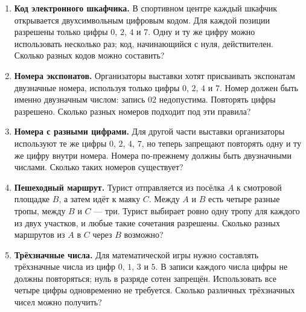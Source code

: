 \documentclass[a4paper,12pt]{article}
\newcommand{\mysub}[1]{\vspace{8pt}{\large\bfseries\color{darkaccent}#1\par}\vspace{1pt}}
\begin{document}
\mysub{Базовый уровень}
\begin{enumerate}[label=\textbf{\arabic*.},leftmargin=9mm,itemsep=12pt]
\item \textbf{Код электронного шкафчика.} В спортивном центре каждый шкафчик открывается двухсимвольным цифровым кодом. Для каждой позиции разрешены только цифры $0$, $2$, $4$ и $7$. Одну и ту же цифру можно использовать несколько раз; код, начинающийся с нуля, действителен. Сколько разных кодов можно составить?

\item \textbf{Номера экспонатов.} Организаторы выставки хотят присваивать экспонатам двузначные номера, используя только цифры $0$, $2$, $4$ и $7$. Номер должен быть именно двузначным числом: запись $02$ недопустима. Повторять цифры разрешено. Сколько разных номеров подходит под эти правила?

\item \textbf{Номера с разными цифрами.} Для другой части выставки организаторы используют те же цифры $0$, $2$, $4$, $7$, но теперь запрещают повторять одну и ту же цифру внутри номера. Номера по-прежнему должны быть двузначными числами. Сколько таких номеров существует?

\item \textbf{Пешеходный маршрут.} Турист отправляется из посёлка $A$ к смотровой площадке $B$, а затем идёт к маяку $C$. Между $A$ и $B$ есть четыре разные тропы, между $B$ и $C$ --- три. Турист выбирает ровно одну тропу для каждого из двух участков, и любые такие сочетания разрешены. Сколько разных маршрутов из $A$ в $C$ через $B$ возможно?

\item \textbf{Трёхзначные числа.} Для математической игры нужно составлять трёхзначные числа из цифр $0$, $1$, $3$ и $5$. В записи каждого числа цифры не должны повторяться; нуль в разряде сотен запрещён. Использовать все четыре цифры одновременно не требуется. Сколько различных трёхзначных чисел можно получить?
\end{enumerate}
\end{document}
